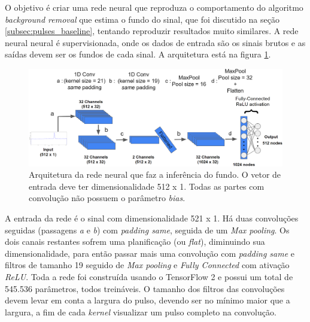 \documentclass[a4paper,12pt,oneside]{book}
\begin{document}
\par O objetivo é criar uma rede neural que reproduza o comportamento do algoritmo \textit{background removal} que estima o fundo do sinal, que foi discutido na seção \ref{subsec:pulses_baseline}, tentando reproduzir resultados muito similares. A rede neural neural é supervisionada, onde os dados de entrada são os sinais brutos e as saídas devem ser os fundos de cada sinal. A arquitetura está na figura \ref{fig:arq_source_to_bkg}.



\begin{figure}[H]
    \centering
    \includegraphics[scale = 0.28]{figs/Source to only bkg.png}
    \caption{Arquitetura da rede neural que faz a inferência do fundo. O vetor de entrada deve ter dimensionalidade 512 x 1. Todas as partes com convolução não possuem o parâmetro \textit{bias}.}
    \label{fig:arq_source_to_bkg}
\end{figure}

\par A entrada da rede é o sinal com dimensionalidade 521 x 1. Há duas convoluções seguidas (passagens \textit{a} e \textit{b}) com \textit{padding same}, seguida de um \textit{Max pooling}. Os dois canais restantes sofrem uma planificação (ou \textit{flat}), diminuindo sua dimensionalidade, para então passar mais uma convolução com \textit{padding same} e filtros de tamanho 19 seguido de \textit{Max pooling} e \textit{Fully Connected} com ativação \textit{ReLU}. Toda a rede foi construída usando o TensorFlow 2 e possui um total de 545.536 parâmetros, todos treináveis. O tamanho dos filtros das convoluções devem levar em conta a largura do pulso, devendo ser no mínimo maior que a largura, a fim de cada \textit{kernel} visualizar um pulso completo na convolução\cite{FORTINO2022166497}.
\end{document}
